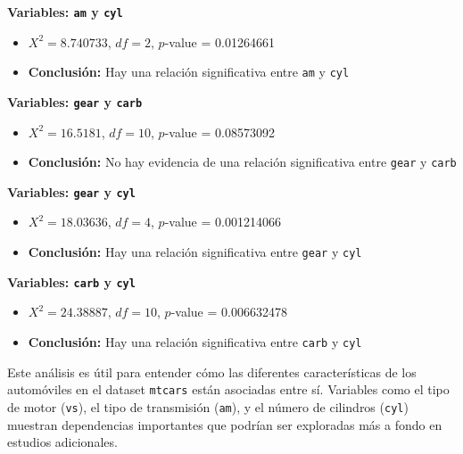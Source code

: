 \documentclass{article}
\begin{document}
\begin{flushleft}
\textbf{Variables: \texttt{am} y \texttt{cyl}}
\begin{itemize}
    \item $X^2 = 8.740733$, $df = 2$, $p$-value = 0.01264661
    \item \textbf{Conclusión:} Hay una relación significativa entre \texttt{am} y \texttt{cyl}
\end{itemize}

\textbf{Variables: \texttt{gear} y \texttt{carb}}
\begin{itemize}
    \item $X^2 = 16.5181$, $df = 10$, $p$-value = 0.08573092
    \item \textbf{Conclusión:} No hay evidencia de una relación significativa entre \texttt{gear} y \texttt{carb}
\end{itemize}

\textbf{Variables: \texttt{gear} y \texttt{cyl}}
\begin{itemize}
    \item $X^2 = 18.03636$, $df = 4$, $p$-value = 0.001214066
    \item \textbf{Conclusión:} Hay una relación significativa entre \texttt{gear} y \texttt{cyl}
\end{itemize}

\textbf{Variables: \texttt{carb} y \texttt{cyl}}
\begin{itemize}
    \item $X^2 = 24.38887$, $df = 10$, $p$-value = 0.006632478
    \item \textbf{Conclusión:} Hay una relación significativa entre \texttt{carb} y \texttt{cyl}
\end{itemize}
\end{flushleft}

Este análisis es útil para entender cómo las diferentes características de los automóviles en el dataset \texttt{mtcars} están asociadas entre sí. Variables como el tipo de motor (\texttt{vs}), el tipo de transmisión (\texttt{am}), y el número de cilindros (\texttt{cyl}) muestran dependencias importantes que podrían ser exploradas más a fondo en estudios adicionales.
\end{document}
